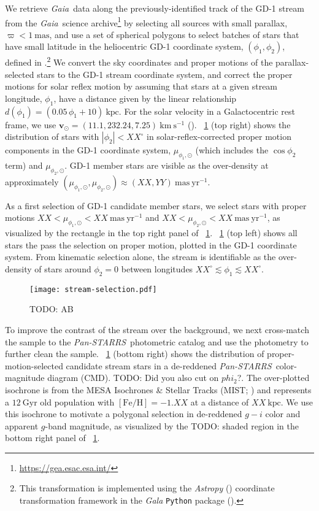 \documentclass[modern]{aastex62}
\newcommand{\package}[1]{\textsl{#1}}
\newcommand{\gaia}{\textsl{Gaia}}
\newcommand{\pans}{\textsl{Pan-STARRS}}
\newcommand{\kpc}{\textrm{kpc}}
\newcommand{\kms}{\ensuremath{\textrm{km}~\textrm{s}^{-1}}}
\newcommand{\bs}[1]{\boldsymbol{#1}}
\newcommand{\masyr}{\ensuremath{\textrm{mas}~\textrm{yr}^{-1}}}
\newcommand{\feh}{\ensuremath{[\textrm{Fe} / \textrm{H}]}}
\newcommand{\todo}[1]{{\color{red} TODO: #1}}
\begin{document}
We retrieve \gaia\ data along the previously-identified track of the GD-1 stream
from the \gaia\ science archive\footnote{\url{https://gea.esac.esa.int/}} by
selecting all sources with small parallax, $\varpi < 1~\textrm{mas}$, and use a
set of spherical polygons to select batches of stars that have small latitude in
the heliocentric GD-1 coordinate system, $(\phi_1, \phi_2)$, defined in
\cite{Koposov:2010}.\footnote{This transformation is implemented using the
\package{Astropy} (\citealt{astropy}) coordinate transformation framework in the
\package{Gala} \texttt{Python} package (\citealt{gala}).}
We convert the sky coordinates and proper motions of the parallax-selected stars
to the GD-1 stream coordinate system, and correct the proper motions for solar
reflex motion by assuming that stars at a given stream longitude, $\phi_1$, have
a distance given by the linear relationship $d(\phi_1) = (0.05 \, \phi_1 +
10)~\textrm{kpc}$.
For the solar velocity in a Galactocentric rest frame, we use $\bs{v}_\odot =
(11.1, 232.24, 7.25)~\kms$ (\citealt{Schonrich:2010, Bovy:2015}).
\figurename~\ref{fig:selection} (top right) shows the distribution of stars with
$|\phi_2| < XX^\circ$ in solar-reflex-corrected proper motion components in the
GD-1 coordinate system, $\mu_{\phi_1, \odot}$ (which includes the $\cos{\phi_2}$
term) and $\mu_{\phi_2, \odot}$.
GD-1 member stars are visible as the over-density at approximately
$(\mu_{\phi_1, \odot}, \mu_{\phi_2, \odot}) \approx (XX, YY)~\masyr$.

As a first selection of GD-1 candidate member stars, we select stars with proper
motions $XX < \mu_{\phi_1, \odot} < XX~\masyr$ and $XX < \mu_{\phi_2, \odot} <
XX~\masyr$, as visualized by the rectangle in the top right panel of
\figurename~\ref{fig:selection}.
\figurename~\ref{fig:selection} (top left) shows all stars the pass the
selection on proper motion, plotted in the GD-1 coordinate system.
From kinematic selection alone, the stream is identifiable as the over-density
of stars around $\phi_2 = 0$ between longitudes $XX^\circ \lesssim \phi_1
\lesssim XX^\circ$.

\begin{figure}[h]
\begin{center}
\texttt{[image: stream-selection.pdf]}
\end{center}
\caption{
    \todo{AB}
\label{fig:selection}
}
\end{figure}

To improve the contrast of the stream over the background, we next cross-match
the sample to the \pans\ photometric catalog and use the photometry to further
clean the sample.
\figurename~\ref{fig:selection} (bottom right) shows the distribution of
proper-motion-selected candidate stream stars in a de-reddened \pans\
color-magnitude diagram (CMD).
\todo{Did you also cut on $phi_2$?}.
The over-plotted isochrone is from the MESA Isochrones \& Stellar Tracks (MIST;
\citealt{Dotter:2016, Choi:2016, Paxton:2011}) and represents a
$12~\textrm{Gyr}$ old population with $\feh = -1.XX$ at a distance of $XX~\kpc$.
We use this isochrone to motivate a polygonal selection in de-reddened $g-i$
color and apparent $g$-band magnitude, as visualized by the \todo{shaded} region
in the bottom right panel of \figurename~\ref{fig:selection}.
\end{document}
